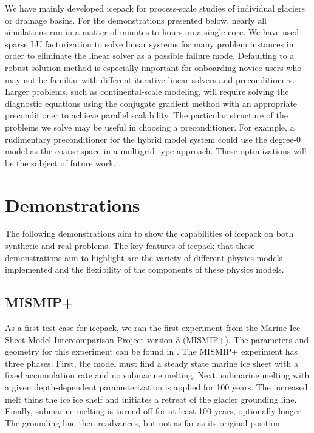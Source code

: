 \documentclass[journal abbreviation, manuscript]{copernicus}
\begin{document}
We have mainly developed icepack for process-scale studies of individual glaciers or drainage basins.
For the demonstrations presented below, nearly all simulations run in a matter of minutes to hours on a single core.
We have used sparse LU factorization to solve linear systems for many problem instances in order to eliminate the linear solver as a possible failure mode.
Defaulting to a robust solution method is especially important for onboarding novice users who may not be familiar with different iterative linear solvers and preconditioners.
Larger problems, such as continental-scale modeling, will require solving the diagnostic equations using the conjugate gradient method with an appropriate preconditioner to achieve parallel scalability.
The particular structure of the problems we solve may be useful in choosing a preconditioner.
For example, a rudimentary preconditioner for the hybrid model system could use the degree-0 model as the coarse space in a multigrid-type approach.
These optimizations will be the subject of future work.

\section{Demonstrations}

The following demonstrations aim to show the capabilities of icepack on both synthetic and real problems.
The key features of icepack that these demonstrations aim to highlight are the variety of different physics models implemented and the flexibility of the components of these physics models.

\subsection{MISMIP+}

As a first test case for icepack, we ran the first experiment from the Marine Ice Sheet Model Intercomparison Project version 3 (MISMIP+).
The parameters and geometry for this experiment can be found in \citet{asay2016experimental}.
The MISMIP+ experiment has three phases.
First, the model must find a steady state marine ice sheet with a fixed accumulation rate and no submarine melting.
Next, submarine melting with a given depth-dependent parameterization is applied for 100 years.
The increased melt thins the ice ice shelf and initiates a retreat of the glacier grounding line.
Finally, submarine melting is turned off for at least 100 years, optionally longer.
The grounding line then readvances, but not as far as its original position.
\end{document}
